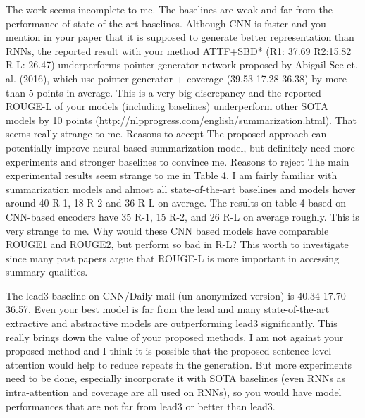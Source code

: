 The work seems incomplete to me. The baselines are weak and far from the performance of state-of-the-art baselines.
Although CNN is faster and you mention in your paper that it is supposed to generate better representation than RNNs, the reported result with your method ATTF+SBD* (R1: 37.69 R2:15.82 R-L: 26.47) underperforms pointer-generator network proposed by Abigail See et. al. (2016), which use pointer-generator + coverage (39.53 17.28 36.38) by more than 5 points in average. This is a very big discrepancy and the reported ROUGE-L of your models (including baselines) underperform other SOTA models by 10 points (http://nlpprogress.com/english/summarization.html). That seems really strange to me.
Reasons to accept
The proposed approach can potentially improve neural-based summarization model, but definitely need more experiments and stronger baselines to convince me.
Reasons to reject
The main experimental results seem strange to me in Table 4. I am fairly familiar with summarization models and almost all state-of-the-art baselines and models hover around 40 R-1, 18 R-2 and 36 R-L on average. The results on table 4 based on CNN-based encoders have 35 R-1, 15 R-2, and 26 R-L on average roughly. This is very strange to me. Why would these CNN based models have comparable ROUGE1 and ROUGE2, but perform so bad in R-L? This worth to investigate since many past papers argue that ROUGE-L is more important in accessing summary qualities.

The lead3 baseline on CNN/Daily mail (un-anonymized version) is 40.34 17.70 36.57. Even your best model is far from the lead and many state-of-the-art extractive and abstractive models are outperforming lead3 significantly. This really brings down the value of your proposed methods. I am not against your proposed method and I think it is possible that the proposed sentence level attention would help to reduce repeats in the generation. But more experiments need to be done, especially incorporate it with SOTA baselines (even RNNs as intra-attention and coverage are all used on RNNs), so you would have model performances that are not far from lead3 or better than lead3.
